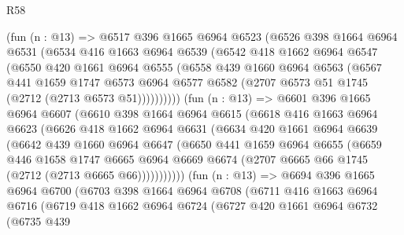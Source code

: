 \begin{lexlean}{R58}
\begin{coremodule}
        (fun (n : @13) =>
        @6517
          @396
          @1665
          @6964
          @6523
          (@6526
            @398
            @1664
            @6964
            @6531
            (@6534
              @416
              @1663
              @6964
              @6539
              (@6542
                @418
                @1662
                @6964
                @6547
                (@6550
                  @420
                  @1661
                  @6964
                  @6555
                  (@6558
                    @439
                    @1660
                    @6964
                    @6563
                    (@6567
                      @441
                      @1659
                      @1747
                      @6573
                      @6964
                      @6577
                      @6582
                      (@2707 @6573 @51 @1745 (@2712 (@2713 @6573 @51))))))))))
        (fun (n : @13) =>
        @6601
          @396
          @1665
          @6964
          @6607
          (@6610
            @398
            @1664
            @6964
            @6615
            (@6618
              @416
              @1663
              @6964
              @6623
              (@6626
                @418
                @1662
                @6964
                @6631
                (@6634
                  @420
                  @1661
                  @6964
                  @6639
                  (@6642
                    @439
                    @1660
                    @6964
                    @6647
                    (@6650
                      @441
                      @1659
                      @6964
                      @6655
                      (@6659
                        @446
                        @1658
                        @1747
                        @6665
                        @6964
                        @6669
                        @6674
                        (@2707 @6665 @66 @1745 (@2712 (@2713 @6665 @66)))))))))))
        (fun (n : @13) =>
        @6694
          @396
          @1665
          @6964
          @6700
          (@6703
            @398
            @1664
            @6964
            @6708
            (@6711
              @416
              @1663
              @6964
              @6716
              (@6719
                @418
                @1662
                @6964
                @6724
                (@6727
                  @420
                  @1661
                  @6964
                  @6732
                  (@6735
                    @439

\end{coremodule}
\end{lexlean}
